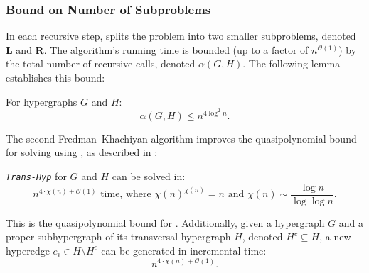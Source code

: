 \subsubsection*{Bound on Number of Subproblems}

In each recursive step, \FKA{} splits the problem into two smaller subproblems, denoted \textbf{L} and \textbf{R}. The algorithm's running time is bounded (up to a factor of $n^{\mathcal{O}(1)}$) by the total number of recursive calls, denoted $\alpha(G,H)$. The following lemma establishes this bound:

\begin{lemma}\label{lem:subproblems}
For hypergraphs $G$ and $H$:
\[
\alpha(G,H)\leq n^{4\log^2 n}.
\]
\end{lemma}
\noindent\textit{\cite{FK96}}

The second Fredman--Khachiyan algorithm improves the quasipolynomial bound for solving \TransHyp{} using \FKA, as described in \cite{FK96}:

\begin{theorem}
\textit{\texttt{Trans-Hyp}} for $G$ and $H$ can be solved in:
\[
n^{4\cdot\chi(n)+\mathcal{O}(1)}\text{ time, where }\chi(n)^{\chi(n)}=n\text{ and }\chi(n)\sim\frac{\log n}{\log\log n}.
\]
\end{theorem}

This is the quasipolynomial bound for \FKB{}. Additionally, given a hypergraph $G$ and a proper subhypergraph of its transversal hypergraph $H$, denoted $H^c\subseteq H$, a new hyperedge $e_i\in H\setminus H^c$ can be generated in incremental time:
\[
n^{4\cdot\chi(n)+\mathcal{O}(1)}.
\]
